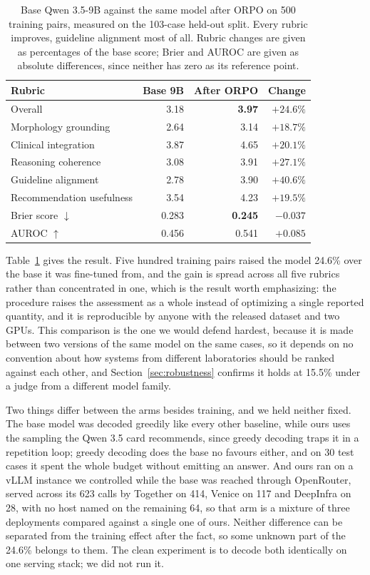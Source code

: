 \begin{table}[H]
\centering
\small
\begin{tabular}{lrrr}
\toprule
\textbf{Rubric} & \textbf{Base 9B} & \textbf{After ORPO} & \textbf{Change} \\
\midrule
Overall & 3.18 & \textbf{3.97} & $+24.6\%$ \\
Morphology grounding & 2.64 & 3.14 & $+18.7\%$ \\
Clinical integration & 3.87 & 4.65 & $+20.1\%$ \\
Reasoning coherence & 3.08 & 3.91 & $+27.1\%$ \\
Guideline alignment & 2.78 & 3.90 & $+40.6\%$ \\
Recommendation usefulness & 3.54 & 4.23 & $+19.5\%$ \\
\midrule
Brier score $\downarrow$ & 0.283 & \textbf{0.245} & $-0.037$ \\
AUROC $\uparrow$ & 0.456 & 0.541 & $+0.085$ \\
\bottomrule
\end{tabular}
\caption{Base Qwen 3.5-9B against the same model after ORPO on 500 training
pairs, measured on the 103-case held-out split. Every rubric improves, guideline
alignment most of all. Rubric changes are given as percentages of the base score;
Brier and AUROC are given as absolute differences, since neither has zero as its
reference point.}
\label{tab:orpo}
\end{table}

Table~\ref{tab:orpo} gives the result. Five hundred training pairs raised the
model 24.6\% over the base it was fine-tuned from, and the gain is spread across
all five rubrics rather than concentrated in one, which is the result worth emphasizing: the procedure raises
the assessment as a whole instead of optimizing a single reported quantity, and it is reproducible by
anyone with the released dataset and two GPUs. This comparison is the one we
would defend hardest, because it is made between two versions of the same model
on the same cases, so it depends on no convention about how systems from
different laboratories should be ranked against each other, and
Section~\ref{sec:robustness} confirms it holds at 15.5\% under a judge from a
different model family.

Two things differ between the arms besides training, and we held neither fixed.
The base model was decoded greedily like every other baseline, while ours uses
the sampling the Qwen 3.5 card recommends, since greedy decoding traps it in a
repetition loop; greedy decoding does the base no favours either, and on 30 test
cases it spent the whole budget without emitting an answer. And ours ran on a
vLLM instance we controlled while the base was reached through OpenRouter, served
across its 623 calls by Together on 414, Venice on 117 and DeepInfra on 28, with
no host named on the remaining 64, so that arm is a mixture of three deployments
compared against a single one of ours. Neither difference can be separated from
the training effect after the fact, so some unknown part of the 24.6\% belongs to
them. The clean experiment is to decode both identically on one serving stack; we
did not run it.

